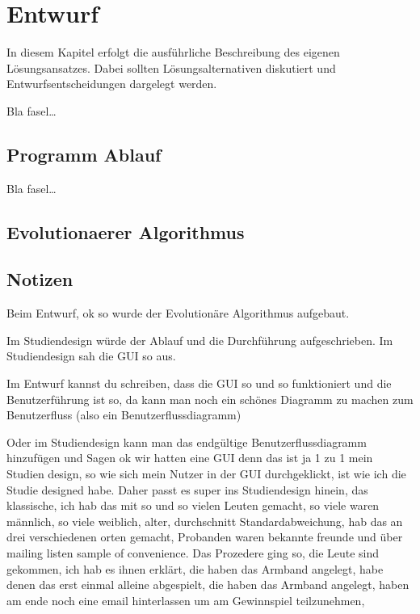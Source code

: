 
\chapter{Entwurf}
\label{ch:Entwurf}
In diesem Kapitel erfolgt die ausf{\"u}hrliche Beschreibung des eigenen
L{\"o}sungsansatzes. Dabei sollten L{\"o}sungsalternativen diskutiert und
Entwurfsentscheidungen dargelegt werden.


Bla fasel\ldots

\section{Programm Ablauf}
\label{ch:Entwurf:sec:Programm Ablauf}

Bla fasel\ldots



\section{Evolutionaerer Algorithmus}
\label{ch:Entwurf:sec:Evolutionaerer Algorithmus}




\section{Notizen}
\label{ch:Entwurf:sec:Notizen}

Beim Entwurf, ok so wurde der Evolution{\"a}re Algorithmus aufgebaut.

Im Studiendesign w{\"u}rde der Ablauf und die Durchf{\"u}hrung aufgeschrieben.
Im Studiendesign sah die GUI so aus. 

Im Entwurf kannst du schreiben, dass die GUI so und so funktioniert und die Benutzerf{\"u}hrung ist so, da kann man noch ein sch{\"o}nes Diagramm zu machen zum Benutzerfluss (also ein Benutzerflussdiagramm) 

Oder im Studiendesign kann man das endg{\"u}ltige Benutzerflussdiagramm hinzuf{\"u}gen und Sagen ok wir hatten eine GUI denn das ist ja 1 zu 1 mein Studien design, so wie sich mein Nutzer in der GUI durchgeklickt, ist wie ich die Studie designed habe. Daher passt es super ins Studiendesign hinein, das klassische, ich hab das mit so und so vielen Leuten gemacht, so viele waren m{\"a}nnlich, so viele weiblich, alter, durchschnitt Standardabweichung, hab das an drei verschiedenen orten gemacht, Probanden waren bekannte freunde und {\"u}ber mailing listen sample of convenience. Das Prozedere ging so, die Leute sind gekommen, ich hab es ihnen erkl{\"a}rt, die haben das Armband angelegt, habe denen das erst einmal alleine abgespielt, die haben das Armband angelegt, haben am ende noch eine email hinterlassen um am Gewinnspiel teilzunehmen,

